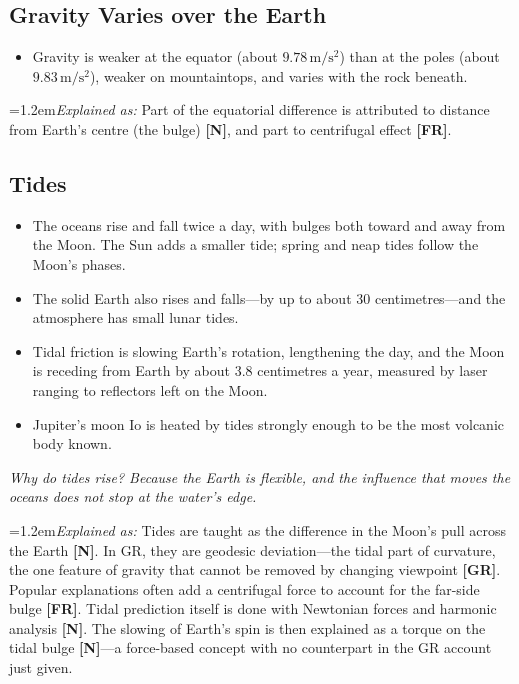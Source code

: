 \documentclass[11pt,a4paper]{article}
\newcommand{\reg}[1]{\textsf{\small\textbf{[#1]}}}
\newcommand{\RN}{\reg{N}}
\newcommand{\RGR}{\reg{GR}}
\newcommand{\RFR}{\reg{FR}}
\newcommand{\expl}[1]{\par\begingroup\leftskip=1.2em\small\noindent\textit{Explained as:} #1\par\endgroup\smallskip}%
\newcommand{\why}[1]{\par\textit{#1}\par}
\begin{document}
\subsection{Gravity Varies over the Earth}

\begin{itemize}
  \item Gravity is weaker at the equator (about $9.78\,\mathrm{m/s^2}$) than at the poles (about $9.83\,\mathrm{m/s^2}$), weaker on mountaintops, and varies with the rock beneath.
\end{itemize}

\expl{Part of the equatorial difference is attributed to distance from Earth's centre (the bulge) \RN{}, and part to centrifugal effect \RFR{}.}

\subsection{Tides}

\begin{itemize}
  \item The oceans rise and fall twice a day, with bulges both toward and away from the Moon. The Sun adds a smaller tide; spring and neap tides follow the Moon's phases.
  \item The solid Earth also rises and falls---by up to about 30 centimetres---and the atmosphere has small lunar tides.
  \item Tidal friction is slowing Earth's rotation, lengthening the day, and the Moon is receding from Earth by about 3.8 centimetres a year, measured by laser ranging to reflectors left on the Moon.
  \item Jupiter's moon Io is heated by tides strongly enough to be the most volcanic body known.
\end{itemize}

\why{Why do tides rise? Because the Earth is flexible, and the influence that moves the oceans does not stop at the water's edge.}

\expl{Tides are taught as the difference in the Moon's pull across the Earth \RN{}. In GR, they are geodesic deviation---the tidal part of curvature, the one feature of gravity that cannot be removed by changing viewpoint \RGR{}. Popular explanations often add a centrifugal force to account for the far-side bulge \RFR{}. Tidal prediction itself is done with Newtonian forces and harmonic analysis \RN{}. The slowing of Earth's spin is then explained as a torque on the tidal bulge \RN{}---a force-based concept with no counterpart in the GR account just given.}
\end{document}
